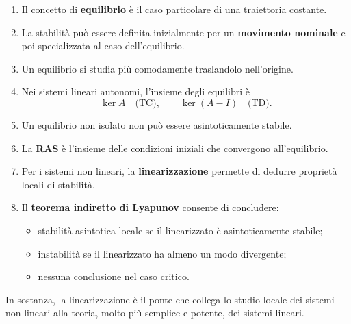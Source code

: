 \begin{enumerate}
    \item Il concetto di \textbf{equilibrio} è il caso particolare di una traiettoria costante.
    \item La stabilità può essere definita inizialmente per un \textbf{movimento nominale} e poi specializzata al caso dell'equilibrio.
    \item Un equilibrio si studia più comodamente traslandolo nell'origine.
    \item Nei sistemi lineari autonomi, l'insieme degli equilibri è
    \[
    \ker A \quad \text{(TC)},
    \qquad
    \ker(A-I) \quad \text{(TD)}.
    \]
    \item Un equilibrio non isolato non può essere asintoticamente stabile.
    \item La \textbf{RAS} è l'insieme delle condizioni iniziali che convergono all'equilibrio.
    \item Per i sistemi non lineari, la \textbf{linearizzazione} permette di dedurre proprietà locali di stabilità.
    \item Il \textbf{teorema indiretto di Lyapunov} consente di concludere:
    \begin{itemize}
        \item stabilità asintotica locale se il linearizzato è asintoticamente stabile;
        \item instabilità se il linearizzato ha almeno un modo divergente;
        \item nessuna conclusione nel caso critico.
    \end{itemize}
\end{enumerate}

\medskip

In sostanza, la linearizzazione è il ponte che collega lo studio locale dei sistemi non lineari alla teoria, molto più semplice e potente, dei sistemi lineari.